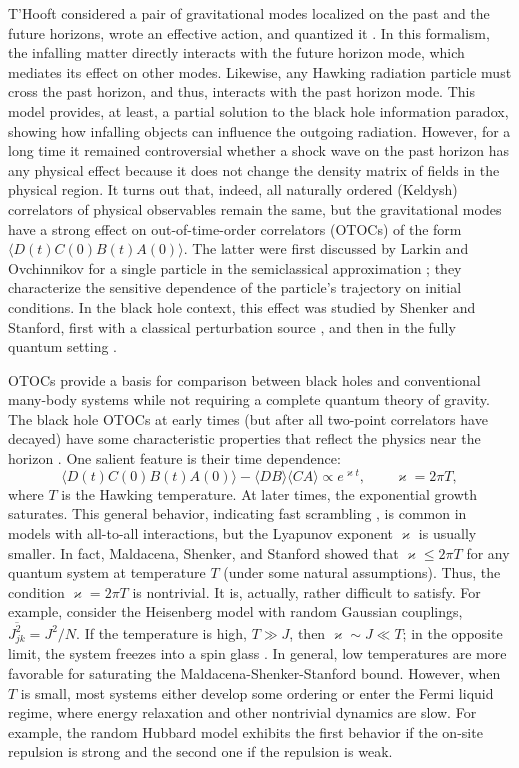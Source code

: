 \documentclass[12pt]{article}
\newcommand{\blangle}{\bigl\langle}
\newcommand{\brangle}{\bigr\rangle}
\newcommand*{\corr}[1]{\langle{#1}\rangle}
\newcommand*{\bcorr}[1]{\blangle{#1}\brangle}
\renewcommand{\le}{\leqslant}
\newcommand{\kap}{\varkappa}
\begin{document}
T'Hooft considered a pair of gravitational modes localized on the past and the future horizons, wrote an effective action, and quantized it \cite{tH87,tH90, tH96}. In this formalism, the infalling matter directly interacts with the future horizon mode, which mediates its effect on other modes. Likewise, any Hawking radiation particle must cross the past horizon, and thus, interacts with the past horizon mode. This model provides, at least, a partial solution to the black hole information paradox, showing how infalling objects can influence the outgoing radiation. However, for a long time it remained controversial whether a shock wave on the past horizon has any physical effect because it does not change the density matrix of fields in the physical region. It turns out that, indeed, all naturally ordered (Keldysh) correlators of physical observables remain the same, but the gravitational modes have a strong effect on out-of-time-order correlators (OTOCs) of the form $\bcorr{D(t)C(0)B(t)A(0)}$. The latter were first discussed by Larkin and Ovchinnikov for a single particle in the semiclassical approximation \cite{LaOv69}; they characterize the sensitive dependence of the particle's trajectory on initial conditions. In the black hole context, this effect was studied by Shenker and Stanford, first with a classical perturbation source \cite{ShSt13}, and then in the fully quantum setting \cite{ShSt14}.

OTOCs provide a basis for comparison between black holes and conventional many-body systems while not requiring a complete quantum theory of gravity. The black hole OTOCs at early times (but after all two-point correlators have decayed) have some characteristic properties that reflect the physics near the horizon \cite{Kit.BPS}. One salient feature is their time dependence:
\begin{equation}
\bcorr{D(t)C(0)B(t)A(0)}-\corr{DB}\corr{CA}
\propto e^{\kap t},\qquad
\kap=2\pi T,
\end{equation}
where $T$ is the Hawking temperature. At later times, the exponential growth saturates. This general behavior, indicating fast scrambling \cite{SeSu08}, is common in models with all-to-all interactions, but the Lyapunov exponent $\kap$ is usually smaller. In fact, Maldacena, Shenker, and Stanford \cite{MSS15} showed that $\kap\le 2\pi T$ for any quantum system at temperature $T$ (under some natural assumptions). Thus, the condition $\kap=2\pi T$ is nontrivial. It is, actually, rather difficult to satisfy. For example, consider the Heisenberg model with random Gaussian couplings, $\overline{J_{jk}^2}=J^2/N$. If the temperature is high, $T\gg J$, then $\kap\sim J\ll T$; in the opposite limit, the system freezes into a spin glass \cite{BrMo80}. In general, low temperatures are more favorable for saturating the Maldacena-Shenker-Stanford bound. However, when $T$ is small, most systems either develop some ordering or enter the Fermi liquid regime, where energy relaxation and other nontrivial dynamics are slow. For example, the random Hubbard model exhibits the first behavior if the on-site repulsion is strong and the second one if the repulsion is weak.
\end{document}
